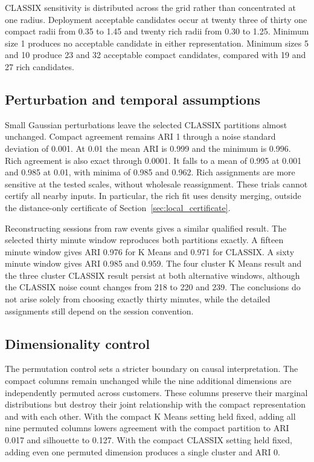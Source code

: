 CLASSIX sensitivity is distributed across the grid rather than concentrated at one radius. Deployment acceptable candidates occur at twenty three of thirty one compact radii from 0.35 to 1.45 and twenty rich radii from 0.30 to 1.25. Minimum size 1 produces no acceptable candidate in either representation. Minimum sizes 5 and 10 produce 23 and 32 acceptable compact candidates, compared with 19 and 27 rich candidates.

\subsection{Perturbation and temporal assumptions}
\label{sec:perturbation_results}

Small Gaussian perturbations leave the selected CLASSIX partitions almost unchanged. Compact agreement remains ARI 1 through a noise standard deviation of 0.001. At 0.01 the mean ARI is 0.999 and the minimum is 0.996. Rich agreement is also exact through 0.0001. It falls to a mean of 0.995 at 0.001 and 0.985 at 0.01, with minima of 0.985 and 0.962. Rich assignments are more sensitive at the tested scales, without wholesale reassignment. These trials cannot certify all nearby inputs. In particular, the rich fit uses density merging, outside the distance-only certificate of Section~\ref{sec:local_certificate}.

Reconstructing sessions from raw events gives a similar qualified result. The selected thirty minute window reproduces both partitions exactly. A fifteen minute window gives ARI 0.976 for K Means and 0.971 for CLASSIX. A sixty minute window gives ARI 0.985 and 0.959. The four cluster K Means result and the three cluster CLASSIX result persist at both alternative windows, although the CLASSIX noise count changes from 218 to 220 and 239. The conclusions do not arise solely from choosing exactly thirty minutes, while the detailed assignments still depend on the session convention.

\subsection{Dimensionality control}

The permutation control sets a stricter boundary on causal interpretation. The compact columns remain unchanged while the nine additional dimensions are independently permuted across customers. These columns preserve their marginal distributions but destroy their joint relationship with the compact representation and with each other. With the compact K Means setting held fixed, adding all nine permuted columns lowers agreement with the compact partition to ARI 0.017 and silhouette to 0.127. With the compact CLASSIX setting held fixed, adding even one permuted dimension produces a single cluster and ARI 0.

